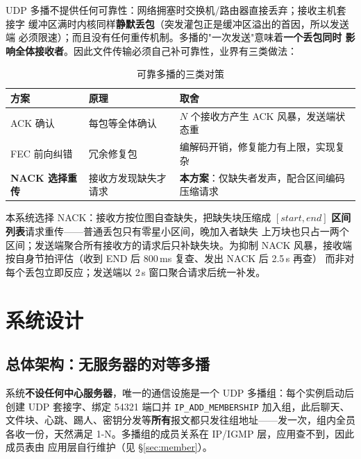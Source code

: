 \documentclass[11pt,a4paper,fontset=fandol]{ctexart}
\begin{document}
UDP 多播不提供任何可靠性：网络拥塞时交换机/路由器直接丢弃；接收主机套接字
缓冲区满时内核同样\textbf{静默丢包}（突发灌包正是缓冲区溢出的首因，所以发送端
必须限速）；而且没有任何重传机制。多播的"一次发送"意味着\textbf{一个丢包同时
影响全体接收者}。因此文件传输必须自己补可靠性，业界有三类做法：

\begin{table}[H]
\centering\footnotesize
\begin{tabularx}{0.98\textwidth}{lXX}
\toprule
方案 & 原理 & 取舍 \\
\midrule
ACK 确认 & 每包等全体确认 & $N$ 个接收方产生 ACK 风暴，发送端状态重 \\
FEC 前向纠错 & 冗余修复包 & 编解码开销，修复能力有上限，实现复杂 \\
\textbf{NACK 选择重传} & 接收方发现缺失才请求 & \textbf{本方案}：仅缺失者发声，配合区间编码压缩请求 \\
\bottomrule
\end{tabularx}
\caption{可靠多播的三类对策}
\label{tab:rel}
\end{table}

\noindent 本系统选择 NACK：接收方按位图自查缺失，把缺失块压缩成
$[start,end]$ \textbf{区间列表}请求重传——普通丢包只有零星小区间，晚加入者缺失
上万块也只占一两个区间；发送端聚合所有接收方的请求后只补缺失块。为抑制 NACK
风暴，接收端按自身节拍评估（收到 END 后 800\,ms 复查、发出 NACK 后 2.5\,s 再查）
而非对每个丢包立即反应；发送端以 2\,s 窗口聚合请求后统一补发。

\section{系统设计}

\subsection{总体架构：无服务器的对等多播}

系统\textbf{不设任何中心服务器}，唯一的通信设施是一个 UDP 多播组：每个实例启动后
创建 UDP 套接字、绑定 54321 端口并 \texttt{IP\_ADD\_MEMBERSHIP} 加入组，此后聊天、
文件块、心跳、踢人、密钥分发等\textbf{所有}报文都只发往组地址——发一次，组内全员
各收一份，天然满足 1-N。多播组的成员关系在 IP/IGMP 层，应用查不到，因此成员表由
应用层自行维护（见 \S\ref{sec:member}）。
\end{document}
